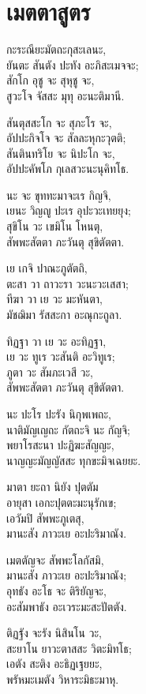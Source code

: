 \chapter[เมตตา]{เมตตาสูตร}


กะระณียะมัตถะกุสะเลนะ,\\
ยันตะ สันตัง ปะทัง อะภิสะเมจจะ;\\
สักโก อุชู จะ สุหุชู จะ,\\
สูวะโจ จัสสะ มุทุ อะนะติมานี.

สันตุสสะโก จะ สุภะโร จะ,\\
อัปปะกิจโจ จะ สัลละหุกะวุตติ;\\
สันตินทริโย จะ นิปะโก จะ,\\
อัปปะคัพโภ กุเลสวะนะนุคิทโธ.

นะ จะ ขุททะมาจะเร กิญจิ,\\
เยนะ วิญญู ปะเร อุปะวะเทยยุง;\\
สุขิโน วะ เขมิโน โหนตุ,\\
สัพพะสัตตา ภะวันตุ สุขิตัตตา.

เย เกจิ ปาณะภูตัตถิ,\\
ตะสา วา ถาวะรา วะนะวะเสสา;\\
ทีฆา วา เย วะ มะหันตา,\\
มัชฌิมา รัสสะกา อะณุกะถูลา.

ทิฏฐา วา เย วะ อะทิฏฐา,\\
เย วะ ทูเร วะสันติ อะวิทูเร;\\
ภูตา วะ สัมภะเวสี วะ,\\
สัพพะสัตตา ภะวันตุ สุขิตัตตา.

นะ ปะโร ปะรัง นิกุพเพถะ,\\
นาติมัญเญถะ กัตถะจิ นะ กัญจิ;\\
พยาโรสะนา ปะฏิฆะสัญญะ,\\
นาญญะมัญญัสสะ ทุกขะมิจเฉยยะ.

มาตา ยะถา นิยัง ปุตตัม\\
อายุสา เอกะปุตตะมะนุรักเข;\\
เอวัมปิ สัพพะภูเตสุ,\\
มานะสัง ภาวะเย อะปะริมาณัง.

เมตตัญจะ สัพพะโลกัสมิ,\\
มานะสัง ภาวะเย อะปะริมาณัง;\\
อุทธัง อะโธ จะ ติริยัญจะ,\\
อะสัมพาธัง อะเวระมะสะปัตตัง.

ติฏฐัง จะรัง นิสินโน วะ,\\
สะยาโน ยาวะตาสสะ วิตะมิทโธ;\\
เอตัง สะติง อะธิฏเฐยยะ,\\
พรัหมะเมตัง วิหาระมิธะมาหุ.

